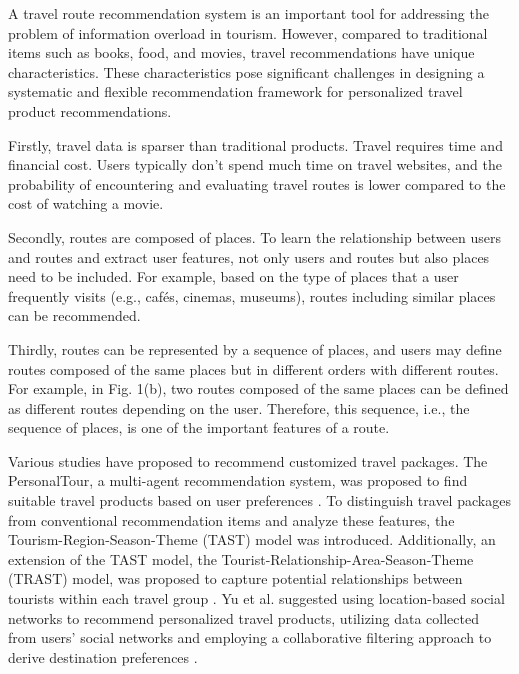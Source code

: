 \documentclass[]{article}
\begin{document}

A travel route recommendation system is an important tool for addressing the problem of information overload in tourism. However, compared to traditional items such as books, food, and movies, travel recommendations have unique characteristics. These characteristics pose significant challenges in designing a systematic and flexible recommendation framework for personalized travel product recommendations. 

Firstly, travel data is sparser than traditional products. Travel requires time and financial cost. Users typically don't spend much time on travel websites, and the probability of encountering and evaluating travel routes is lower compared to the cost of watching a movie. 

Secondly, routes are composed of places. To learn the relationship between users and routes and extract user features, not only users and routes but also places need to be included. For example, based on the type of places that a user frequently visits (e.g., cafés, cinemas, museums), routes including similar places can be recommended.

Thirdly, routes can be represented by a sequence of places, and users may define routes composed of the same places but in different orders with different routes. For example, in Fig. 1(b), two routes composed of the same places can be defined as different routes depending on the user. Therefore, this sequence, i.e., the sequence of places, is one of the important features of a route.

Various studies have proposed to recommend customized travel packages. The PersonalTour, a multi-agent recommendation system, was proposed to find suitable travel products based on user preferences \cite{6040800}. To distinguish travel packages from conventional recommendation items and analyze these features, the Tourism-Region-Season-Theme (TAST) model was introduced. Additionally, an extension of the TAST model, the Tourist-Relationship-Area-Season-Theme (TRAST) model, was proposed to capture potential relationships between tourists within each travel group \cite{6365185}. Yu et al. suggested using location-based social networks to recommend personalized travel products, utilizing data collected from users' social networks and employing a collaborative filtering approach to derive destination preferences \cite{7145457}.
\end{document}
